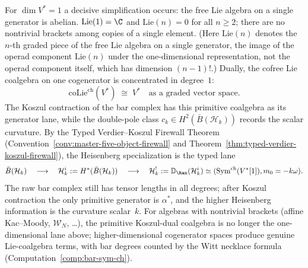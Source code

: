 For $\dim V^* = 1$ a decisive simplification occurs:
the free Lie algebra on a single generator is abelian.
$\mathrm{Lie}(1) = \C$ and $\mathrm{Lie}(n) = 0$ for
all $n \geq 2$; there are no nontrivial brackets among copies
of a single element. (Here $\mathrm{Lie}(n)$ denotes the $n$-th
graded piece of the free Lie algebra on a single generator, the
image of the operad component $\mathrm{Lie}(n)$ under the
one-dimensional representation, not the operad component itself,
which has dimension $(n{-}1)!$.) Dually, the cofree Lie coalgebra
on one cogenerator is concentrated in degree~$1$:
\[
\mathrm{coLie}^{\mathrm{ch}}(V^*) \;\cong\; V^*
\quad\text{as a graded vector space.}
\]
The Koszul contraction of the bar complex has this primitive
coalgebra as its generator lane, while the double-pole class
$c_k \in H^2(\bar B(\mathcal H_k))$ records the scalar curvature.
By the Typed Verdier--Koszul Firewall Theorem
(Convention~\ref{conv:master-five-object-firewall} and
Theorem~\ref{thm:typed-verdier-koszul-firewall}), the Heisenberg
specialization is the typed lane
\[
\bar B(\mathcal H_k)
\quad\longrightarrow\quad
\mathcal H_k^i := H^*(\bar B(\mathcal H_k))
\quad\longrightarrow\quad
\mathcal H_k^! := \mathbb{D}_{\Ran}(\mathcal H_k^i)
\simeq (\mathrm{Sym}^{\mathrm{ch}}(V^*[1]),m_0=-k\omega).
\]
The raw bar complex still has tensor lengths in all degrees; after
Koszul contraction the only primitive generator is $\alpha^*$, and
the higher Heisenberg information is the curvature scalar~$k$.
For algebras with nontrivial brackets (affine Kac--Moody,
$\mathcal{W}_N$, \ldots), the primitive Koszul-dual coalgebra is
no longer the one-dimensional lane above; higher-dimensional
cogenerator spaces produce genuine Lie-coalgebra terms, with bar
degrees counted by the Witt necklace formula
(Computation~\ref{comp:bar-sym-ch}).

